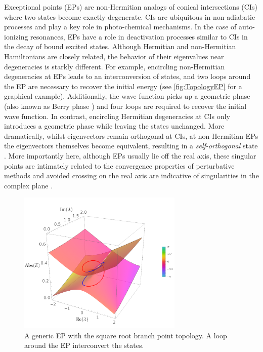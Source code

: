 \documentclass[11pt,a4paper]{article}
\begin{document}
Exceptional points (EPs) \cite{Heiss_1990, Heiss_1999, Heiss_2012, Heiss_2016} are non-Hermitian analogs of conical intersections (CIs) \cite{Yarkony_1996} where two states become exactly degenerate.
CIs are ubiquitous in non-adiabatic processes and play a key role in photo-chemical mechanisms.
In the case of auto-ionizing resonances, EPs have a role in deactivation processes similar to CIs in the decay of bound excited states.
Although Hermitian and non-Hermitian Hamiltonians are closely related, the behavior of their eigenvalues near degeneracies is starkly different.
For example, encircling non-Hermitian degeneracies at EPs leads to an interconversion of states, and two loops around the EP are necessary to recover the initial energy (see \autoref{fig:TopologyEP} for a graphical example).
Additionally, the wave function picks up a geometric phase (also known as Berry phase \cite{Berry_1984}) and four loops are required to recover the initial wave function.
In contrast, encircling Hermitian degeneracies at CIs only introduces a geometric phase while leaving the states unchanged.
More dramatically, whilst eigenvectors remain orthogonal at CIs, at non-Hermitian EPs the eigenvectors themselves become equivalent, resulting in a \textit{self-orthogonal} state \cite{MoiseyevBook}.
More importantly here, although EPs usually lie off the real axis, these singular points are intimately related to the convergence properties of perturbative methods and avoided crossing on the real axis are indicative of singularities in the complex plane \cite{Olsen_1996, Olsen_2000}.

\begin{figure}[h!]
    \centering
    \includegraphics[width=0.7\textwidth]{TopologyEP.pdf}
    \caption{\centering A generic EP with the square root branch point topology. A loop around the EP interconvert the states.}
    \label{fig:TopologyEP}
\end{figure}
\end{document}
